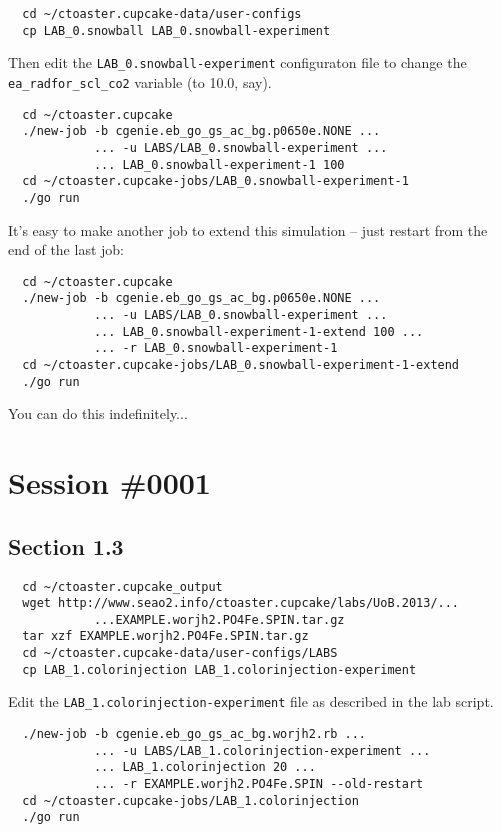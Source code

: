\documentclass[a4paper,10pt,article]{memoir}
\begin{document}
\begin{verbatim}
  cd ~/ctoaster.cupcake-data/user-configs
  cp LAB_0.snowball LAB_0.snowball-experiment
\end{verbatim}

Then edit the \texttt{LAB\_0.snowball-experiment} configuraton file to
change the \texttt{ea\_radfor\_scl\_co2} variable (to 10.0, say).

\begin{verbatim}
  cd ~/ctoaster.cupcake
  ./new-job -b cgenie.eb_go_gs_ac_bg.p0650e.NONE ...
            ... -u LABS/LAB_0.snowball-experiment ...
            ... LAB_0.snowball-experiment-1 100
  cd ~/ctoaster.cupcake-jobs/LAB_0.snowball-experiment-1
  ./go run
\end{verbatim}

It's easy to make another job to extend this simulation -- just
restart from the end of the last job:
\begin{verbatim}
  cd ~/ctoaster.cupcake
  ./new-job -b cgenie.eb_go_gs_ac_bg.p0650e.NONE ...
            ... -u LABS/LAB_0.snowball-experiment ...
            ... LAB_0.snowball-experiment-1-extend 100 ...
            ... -r LAB_0.snowball-experiment-1
  cd ~/ctoaster.cupcake-jobs/LAB_0.snowball-experiment-1-extend
  ./go run
\end{verbatim}
You can do this indefinitely...

\section{Session \#0001}

\subsection*{Section 1.3}

\begin{verbatim}
  cd ~/ctoaster.cupcake_output
  wget http://www.seao2.info/ctoaster.cupcake/labs/UoB.2013/...
            ...EXAMPLE.worjh2.PO4Fe.SPIN.tar.gz
  tar xzf EXAMPLE.worjh2.PO4Fe.SPIN.tar.gz
  cd ~/ctoaster.cupcake-data/user-configs/LABS
  cp LAB_1.colorinjection LAB_1.colorinjection-experiment
\end{verbatim}

Edit the \texttt{LAB\_1.colorinjection-experiment} file as described
in the lab script.

\begin{verbatim}
  ./new-job -b cgenie.eb_go_gs_ac_bg.worjh2.rb ...
            ... -u LABS/LAB_1.colorinjection-experiment ...
            ... LAB_1.colorinjection 20 ...
            ... -r EXAMPLE.worjh2.PO4Fe.SPIN --old-restart
  cd ~/ctoaster.cupcake-jobs/LAB_1.colorinjection
  ./go run
\end{verbatim}
\end{document}
